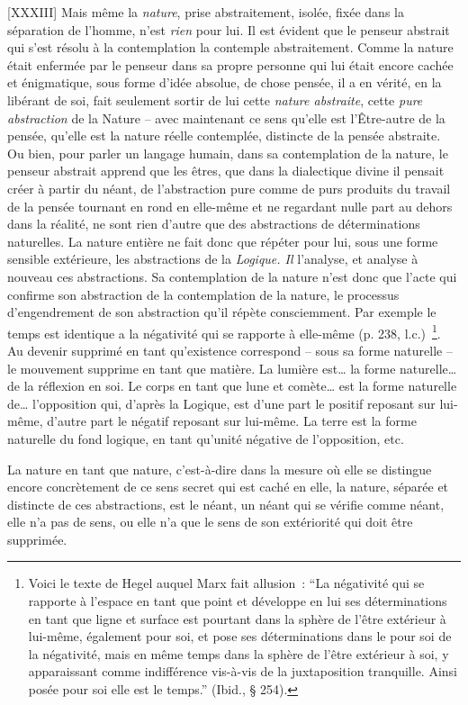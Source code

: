 \documentclass[french,twoside]{book} %
\begin{document}
[XXXIII] Mais même la \emph{nature}, prise abstraitement, isolée, fixée dans la séparation de l’homme, n’est \emph{rien} pour lui. Il est évident que le penseur abstrait qui s’est résolu à la contemplation la contemple abstraitement. Comme la nature était enfermée par le penseur dans sa propre personne qui lui était encore cachée et énigmatique, sous forme d’idée absolue, de chose pensée, il a en vérité, en la libérant de soi, fait seulement sortir de lui cette \emph{nature abstraite}, cette \emph{pure abstraction} de la Nature – avec maintenant ce sens qu’elle est l’Être-autre de la pensée, qu’elle est la nature réelle contemplée, distincte de la pensée abstraite. Ou bien, pour parler un langage humain, dans sa contemplation de la nature, le penseur abstrait apprend que les êtres, que dans la dialectique divine il pensait créer à partir du néant, de l’abstraction pure comme de purs produits du travail de la pensée tournant en rond en elle-même et ne regardant nulle part au dehors dans la réalité, ne sont rien d’autre que des abstractions de déterminations naturelles. La nature entière ne fait donc que répéter pour lui, sous une forme sensible extérieure, les abstractions de la \emph{Logique. Il} l’analyse, et analyse à nouveau ces abstractions. Sa contemplation de la nature n’est donc que l’acte qui confirme son abstraction de la contemplation de la nature, le processus d’engendrement de son abstraction qu’il répète consciemment. Par exemple le temps est identique a la négativité qui se rapporte à elle-même (p. 238, l.c.) \footnote{Voici le texte de Hegel auquel Marx fait allusion : “La négativité qui se rapporte à l’espace en tant que point et développe en lui ses déterminations en tant que ligne et surface est pourtant dans la sphère de l’être extérieur à lui-même, également pour soi, et pose ses déterminations dans le pour soi de la négativité, mais en même temps dans la sphère de l’être extérieur à soi, y apparaissant comme indifférence vis-à-vis de la juxtaposition tranquille. Ainsi posée pour soi elle est le temps.” (Ibid., § 254).}. Au devenir supprimé en tant qu’existence correspond – sous sa forme naturelle – le mouvement supprime en tant que matière. La lumière est… la forme naturelle… de la réflexion en soi. Le corps en tant que lune et comète… est la forme naturelle de… l’opposition qui, d’après la Logique, est d’une part le positif reposant sur lui-même, d’autre part le négatif reposant sur lui-même. La terre est la forme naturelle du fond logique, en tant qu’unité négative de l’opposition, etc.\par
La nature en tant que nature, c’est-à-dire dans la mesure où elle se distingue encore concrètement de ce sens secret qui est caché en elle, la nature, séparée et distincte de ces abstractions, est le néant, un néant qui se vérifie comme néant, elle n’a pas de sens, ou elle n’a que le sens de son extériorité qui doit être supprimée.\par
\end{document}
